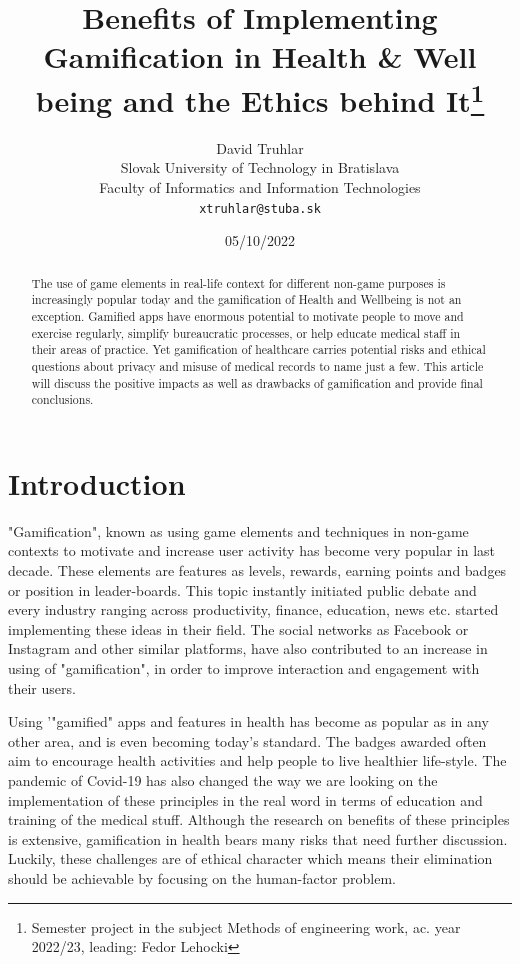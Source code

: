 \documentclass[10pt,twoside,english,a4paper]{article}
\title{Benefits of Implementing Gamification in Health \& Well being and the Ethics behind It\thanks{Semester project in the subject Methods of engineering work, ac. year 2022/23, leading: Fedor Lehocki}} %
\author{David Truhlar\\[2pt]
	{\small Slovak University of Technology in Bratislava}\\
	{\small Faculty of Informatics and Information Technologies}\\
	{\small \texttt{xtruhlar@stuba.sk}}
	}
\date{\small 05/10/2022} %
\begin{document}
\maketitle

\begin{abstract}
The use of game elements in real-life context for different non-game purposes is increasingly popular today and the gamification of Health and Wellbeing is not an exception. Gamified apps have enormous potential to motivate people to move and exercise regularly, simplify bureaucratic processes, or help educate medical staff in their areas of practice. Yet gamification of healthcare carries potential risks and ethical questions about privacy and misuse of medical records to name just a few. This article will discuss the positive impacts as well as drawbacks of gamification and provide final conclusions.
\end{abstract}

%
%
%

\section*{Introduction}
"Gamification", known as using game elements and techniques  in non-game contexts to motivate and increase user activity \cite{Gamefulness} has become very popular in last decade. These elements are features as levels, rewards, earning points and badges or position in leader-boards. This topic instantly initiated public debate and every industry ranging across productivity, finance, education, news etc. \cite{Gamefulness} started implementing these ideas in their field. The social networks as Facebook or Instagram and other similar platforms, have also contributed to an increase in using of "gamification", in order to improve interaction and engagement with their users. 

Using '"gamified" apps and features in health  has become as popular as  in any other area, and is even becoming today's standard. The badges awarded often aim to encourage health activities and help people to live healthier life-style. The pandemic of Covid-19 has also changed the way we are looking on the implementation of these principles in the real word in terms of education and training of the medical stuff.  Although the research on benefits of these principles is extensive, gamification in health bears many risks that need further discussion. Luckily, these challenges are of ethical character which means their elimination should be achievable by focusing on the human-factor problem.
\end{document}

